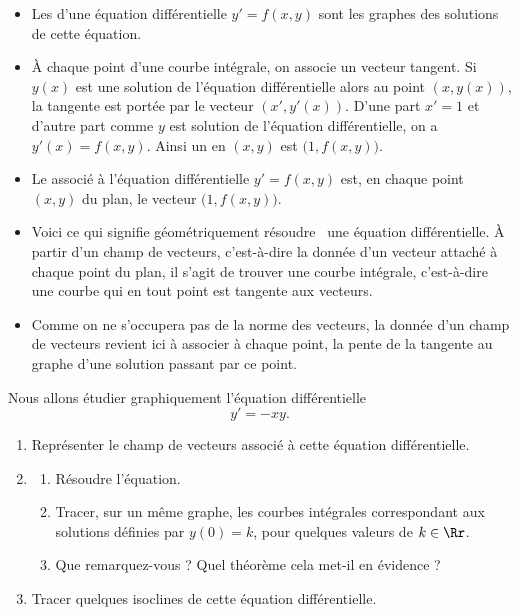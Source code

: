 \documentclass[class=report,crop=false]{standalone}
\begin{document}
\begin{itemize}
  \item Les  d'une équation différentielle $y' = f(x,y)$
sont les graphes des solutions de cette équation.
  
  \item \`A chaque point d'une courbe intégrale, on associe un vecteur tangent.
Si $y(x)$ est une solution de l'équation différentielle alors
au point $(x,y(x))$, la tangente est portée par le vecteur $(x',y'(x))$.
D'une part $x' = 1$ et d'autre part comme $y$ est solution de l'équation différentielle, 
on a $y'(x) = f(x,y)$. Ainsi un  en $(x,y)$ est $\big( 1 , f(x,y) \big)$.

  
  \item %
  Le \defi{champ de vecteurs} associé à l'équation différentielle
$y' = f(x,y)$ est, en chaque point $(x,y)$ du plan, 
le vecteur $\big( 1 , f(x,y) \big)$.

  \item Voici ce qui signifie géométriquement \og résoudre \fg\ une équation différentielle.
\`A partir d'un champ de vecteurs, c'est-à-dire la donnée d'un vecteur
attaché à chaque point du plan, il s'agit de trouver une courbe intégrale,
c'est-à-dire une courbe qui en tout point est tangente aux vecteurs.


  \item Comme on ne s'occupera pas de la norme des vecteurs, la donnée d'un champ de vecteurs
revient ici à associer à chaque point, la pente de la tangente au graphe 
d'une solution passant par ce point.
\end{itemize}

\begin{tp}
Nous allons étudier graphiquement l'équation différentielle 
  $$y' = -xy.$$
\begin{enumerate}
  \item Représenter le champ de vecteurs associé à cette équation différentielle.
 
  \item 
  \begin{enumerate}
    \item Résoudre l'équation.
    
    \item Tracer, sur un même graphe, les courbes intégrales correspondant aux solutions
    définies par $y(0)=k$, pour quelques valeurs de $k\in\Rr$.
    
    \item Que remarquez-vous ? Quel théorème cela met-il en évidence ? 
  \end{enumerate}
  
  \item Tracer quelques isoclines de cette équation différentielle.
\end{enumerate}
\end{tp}
\end{document}
